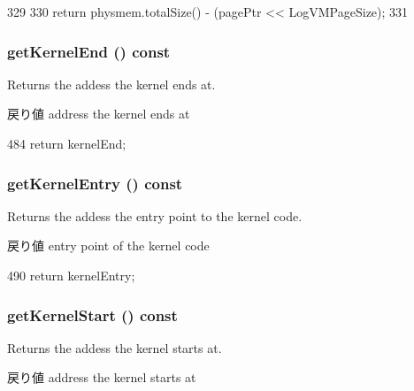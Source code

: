 \begin{DoxyCode}
329 {
330    return physmem.totalSize() - (pagePtr << LogVMPageSize);
331 }
\end{DoxyCode}
\hypertarget{classSystem_ab1fd157e4287a41711d83b7a48161c2b}{
\subsubsection[{getKernelEnd}]{ getKernelEnd () const}}
\label{classSystem_ab1fd157e4287a41711d83b7a48161c2b}
Returns the addess the kernel ends at. \begin{DoxyReturn}{戻り値}
address the kernel ends at 
\end{DoxyReturn}



\begin{DoxyCode}
484 { return kernelEnd; }
\end{DoxyCode}
\hypertarget{classSystem_a21bc77f01980debea40a75c23c9a7ae8}{
\subsubsection[{getKernelEntry}]{ getKernelEntry () const}}
\label{classSystem_a21bc77f01980debea40a75c23c9a7ae8}
Returns the addess the entry point to the kernel code. \begin{DoxyReturn}{戻り値}
entry point of the kernel code 
\end{DoxyReturn}



\begin{DoxyCode}
490 { return kernelEntry; }
\end{DoxyCode}
\hypertarget{classSystem_a5e068cbb27ba6c95ea26869f88964845}{
\subsubsection[{getKernelStart}]{ getKernelStart () const}}
\label{classSystem_a5e068cbb27ba6c95ea26869f88964845}
Returns the addess the kernel starts at. \begin{DoxyReturn}{戻り値}
address the kernel starts at 
\end{DoxyReturn}



